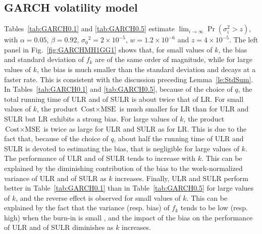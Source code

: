 \documentclass[a4paper,11pt]{article}
\begin{document}
\subsection{GARCH volatility model}
Tables~\ref{tab:GARCH0.1} and \ref{tab:GARCH0.5} estimate  \(\lim_{i\rightarrow\infty}\Pr(\sigma_{i}^{2}> z)\), with   \(\alpha=0.05\), \(\beta=0.92\),   \({\sigma_{0}}^{2}=2\times10^{-5}\), \(w=1.2\times10^{-6}\) and \(z=4\times10^{-5}\).    The left panel in Fig.~\ref{fig:GARCHMH1GG1} shows that, for small values of \(k\), the bias and standard deviation of \(f_{k}\)  are of the same order of magnitude, while for large values of \(k\), the bias is much smaller than the standard deviation and decays at a faster rate. This is consistent with the discussion preceding  Lemma~\ref{le:StdSum}.  In Tables~\ref{tab:GARCH0.1} and \ref{tab:GARCH0.5}, because of the choice of \(q\),  the total running time of   ULR and of SULR is about twice that of LR. For small values of  \(k\), the product \(\text{Cost}\times\text{MSE}\) is much smaller for LR than for ULR and SULR but  LR exhibits a strong bias.  For large values of \(k\), the product \(\text{Cost}\times\text{MSE}\) is twice as large for ULR and SULR as for LR. This is due to the fact that, because of the choice of \(q\), about half the running time of   ULR and SULR is devoted to estimating the bias, that is negligible for large values of  \(k\). The performance of ULR and of  SULR tends to increase with \(k\). This can be explained by the diminishing contribution of the bias to the work-normalized variance of  ULR and of  SULR   as \(k\) increases.  Finally,  ULR and SULR perform better in  Table~\ref{tab:GARCH0.1} than in Table~\ref{tab:GARCH0.5} for large  values of \(k\), and the reverse effect is observed for small values of \(k\). This can be explained by the fact that the variance (resp. bias) of \(f_{k}\) tends to be low (resp. high) when the burn-in is small \cite{whitt1991longRun}, and the impact of the bias on the performance of ULR and of  SULR diminishes as \(k\) increases.  
\end{document}
